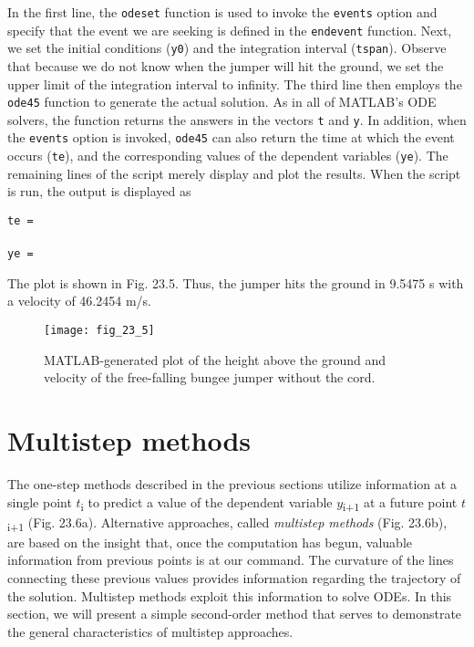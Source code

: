 \documentclass[../main.tex]{subfiles}
\begin{document}
\noindent In the first line, the \texttt{odeset} function is used to invoke the \texttt{events} option and specify that the event we are seeking is defined in the \texttt{endevent} function. Next, we set the initial conditions (\texttt{y0}) and the integration interval (\texttt{tspan}).
Observe that because we do not know when the
jumper will hit the ground, we set the upper limit of the integration interval to infinity.
The third line then employs the \texttt{ode45} function to generate the actual solution. As in all of
MATLAB's ODE solvers, the function returns the answers in the vectors \texttt{t} and \texttt{y}. In addition,
when the \texttt{events} option is invoked, \texttt{ode45} can also return the time at which the event occurs
(\texttt{te}), and the corresponding values of the dependent variables (\texttt{ye}). The remaining lines of the script merely display and plot the results. When the script is run, the output is displayed as

\texttt{te =\\
\indent{}\\
\indent ye =\\
\indent{} }

\noindent The plot is shown in Fig. 23.5. Thus, the jumper hits the ground in 9.5475 s with a velocity of 46.2454 m/s.

\begin{figure}[H]
    \centering
    \texttt{[image: fig\_23\_5]}
   \caption{\textsf{MATLAB-generated plot of the height above the ground and velocity of the free-falling bungee jumper without the cord.}}\label{fig:fig_23_5}
\end{figure}



\vspace{2cm}
\section{Multistep methods}

The one-step methods described in the previous sections utilize information at a single
point $t$\textsubscript{i} to predict a value of the dependent variable $y$\textsubscript{i+1} at a future point $t$\textsubscript{i+1} (Fig. 23.6a).
Alternative approaches, called \textit{multistep methods} (Fig. 23.6b), are based on the insight that,
once the computation has begun, valuable information from previous points is at our
command. The curvature of the lines connecting these previous values provides information regarding the trajectory of the solution. Multistep methods exploit this information to
solve ODEs. In this section, we will present a simple second-order method that serves to
demonstrate the general characteristics of multistep approaches.
\end{document}
